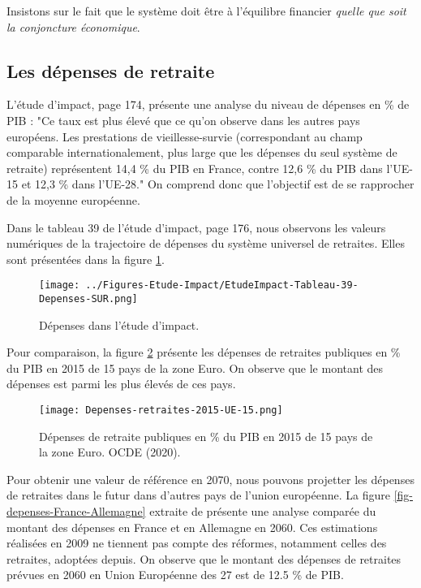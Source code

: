 \documentclass[10pt]{article}
\begin{document}
Insistons sur le fait que le système doit être à 
l'équilibre financier \emph{quelle que soit la 
conjoncture économique}. 


\subsection{Les dépenses de retraite}

L'étude d'impact, page 174, présente une analyse du niveau de dépenses 
en \% de PIB : "Ce taux est plus élevé que ce qu’on observe dans 
les autres pays européens. Les prestations de vieillesse-survie 
(correspondant au champ comparable internationalement, plus 
large que les dépenses du seul système de retraite) représentent 
14,4 \% du PIB en France, contre 12,6 \% du PIB dans l’UE-15 et 12,3 \% dans l’UE-28."
On comprend donc que l'objectif est de se rapprocher de la moyenne européenne. 

Dans le tableau 39 de l'étude d'impact, page 176, nous observons les valeurs numériques de la trajectoire de dépenses du système universel de retraites. 
Elles sont présentées dans la figure \ref{fig-depenses-etude-impact}.

\begin{figure}
\begin{center}
\texttt{[image: ../Figures-Etude-Impact/EtudeImpact-Tableau-39-Depenses-SUR.png]}
\end{center}
\caption{Dépenses dans l'étude d'impact.}
\label{fig-depenses-etude-impact}
\end{figure}

Pour comparaison, la figure \ref{fig-depenses-UE-15-2020} présente les dépenses de retraites 
publiques en \% du PIB en 2015 de 15 pays de la zone Euro.  
On observe que le montant des dépenses est parmi les plus élevés de ces pays. 

\begin{figure}
\begin{center}
\texttt{[image: Depenses-retraites-2015-UE-15.png]}
\end{center}
\caption{Dépenses de retraite publiques en \% du PIB en 2015 de 15 pays de la zone Euro. 
OCDE (2020). }
\label{fig-depenses-UE-15-2020}
\end{figure}

Pour obtenir une valeur de référence en 2070, nous pouvons projetter les dépenses de 
retraites dans le futur dans d'autres pays de l'union européenne.  
La figure \ref{fig-depenses-France-Allemagne} extraite 
de \cite{ProspectiveSenat} présente une analyse 
comparée du montant des dépenses en France et en Allemagne en 2060. 
Ces estimations réalisées en 2009 ne tiennent pas compte des réformes, 
notamment celles des retraites, adoptées depuis. 
On observe que le montant des dépenses de retraites prévues en 2060 
en Union Européenne des 27 est de 12.5 \% de PIB.
\end{document}
